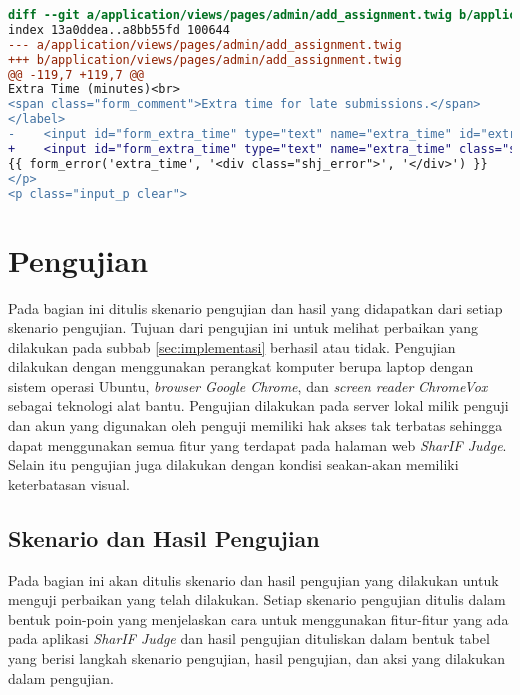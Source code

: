 \begin{lstlisting}[language=diff, caption=Perubahan untuk mematuhi kriteria 4.1.1, label=lst_4.1.1, basicstyle=\ttfamily, frame=single,
columns=fullflexible, keepspaces=true, breaklines=true]
diff --git a/application/views/pages/admin/add_assignment.twig b/application/views/pages/admin/add_assignment.twig
index 13a0ddea..a8bb55fd 100644
--- a/application/views/pages/admin/add_assignment.twig
+++ b/application/views/pages/admin/add_assignment.twig
@@ -119,7 +119,7 @@
Extra Time (minutes)<br>
<span class="form_comment">Extra time for late submissions.</span>
</label>
-    <input id="form_extra_time" type="text" name="extra_time" id="extra_time" class="sharif_input medium" value="{{ edit ? edit_assignment.extra_time|extra_time_formatter : set_value('extra_time') }}" />
+    <input id="form_extra_time" type="text" name="extra_time" class="sharif_input medium" value="{{ edit ? edit_assignment.extra_time|extra_time_formatter : set_value('extra_time') }}" />
{{ form_error('extra_time', '<div class="shj_error">', '</div>') }}
</p>
<p class="input_p clear">
\end{lstlisting}

\section{Pengujian}
\label{sec:pengujian}
Pada bagian ini ditulis skenario pengujian dan hasil yang didapatkan dari setiap skenario pengujian. Tujuan dari pengujian ini untuk melihat perbaikan yang dilakukan pada subbab \ref{sec:implementasi} berhasil atau tidak. Pengujian dilakukan dengan menggunakan perangkat komputer berupa laptop dengan sistem operasi Ubuntu, \textit{browser} \textit{Google Chrome}, dan \textit{screen reader} \textit{ChromeVox} sebagai teknologi alat bantu. Pengujian dilakukan pada server lokal milik penguji dan akun yang digunakan oleh penguji memiliki hak akses tak terbatas sehingga dapat menggunakan semua fitur yang terdapat pada halaman web \textit{SharIF Judge}. Selain itu pengujian juga dilakukan dengan kondisi seakan-akan memiliki keterbatasan visual.

\subsection{Skenario dan Hasil Pengujian}
\label{subsec:skenario_pengujian}
Pada bagian ini akan ditulis skenario dan hasil pengujian yang dilakukan untuk menguji perbaikan yang telah dilakukan. Setiap skenario pengujian ditulis dalam bentuk poin-poin yang menjelaskan cara untuk menggunakan fitur-fitur yang ada pada aplikasi \textit{SharIF Judge} dan hasil pengujian dituliskan dalam bentuk tabel yang berisi langkah skenario pengujian, hasil pengujian, dan aksi yang dilakukan dalam pengujian.

